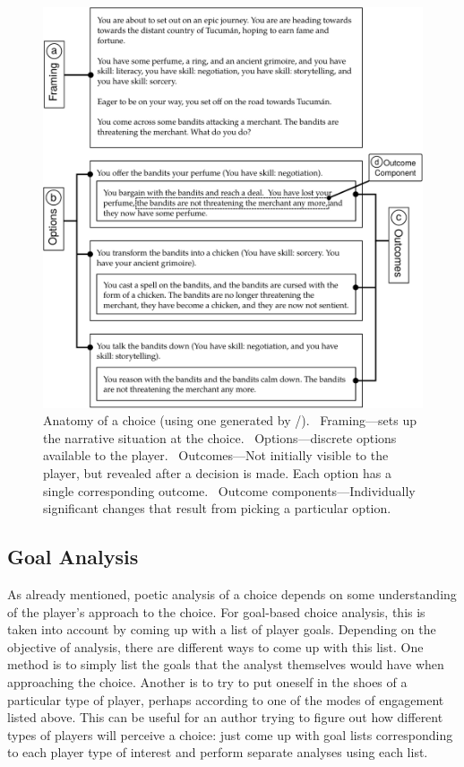 \begin{figure}[!p]
\centering
\includegraphics[width=\textwidth]{fig/choice-anatomy-crop.pdf}
\caption[Anatomy of a choice]{%
Anatomy of a choice (using one generated by \dunyazad/).
%
~Framing---sets up the narrative situation at the choice.
%
~Options---discrete options available to the player.
%
~Outcomes---Not initially visible to the player, but revealed after a decision is made.
%
Each option has a single corresponding outcome.
%
~Outcome components---Individually significant changes that result from picking a particular option.}
\label{fig:choice-anatomy}
\end{figure}


\subsection{Goal Analysis}

\label{sec:cp-goal-analysis}

As already mentioned, poetic analysis of a choice depends on some understanding of the player's approach to the choice.
%
For goal-based choice analysis, this is taken into account by coming up with a list of player goals.
%
Depending on the objective of analysis, there are different ways to come up with this list.
%
One method is to simply list the goals that the analyst themselves would have when approaching the choice.
%
Another is to try to put oneself in the shoes of a particular type of player, perhaps according to one of the modes of engagement listed above.
%
This can be useful for an author trying to figure out how different types of players will perceive a choice: just come up with goal lists corresponding to each player type of interest and perform separate analyses using each list.


